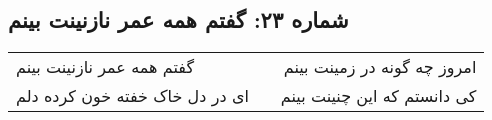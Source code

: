 \begin{center}
\section*{شماره ۲۳: گفتم همه عمر نازنینت بینم}
\label{sec:023}
\begin{longtable}{l p{0.5cm} r}
گفتم همه عمر نازنینت بینم
&&
امروز چه گونه در زمینت بینم
\\
ای در دل خاک خفته خون کرده دلم
&&
کی دانستم که این چنینت بینم
\\
\end{longtable}
\end{center}
